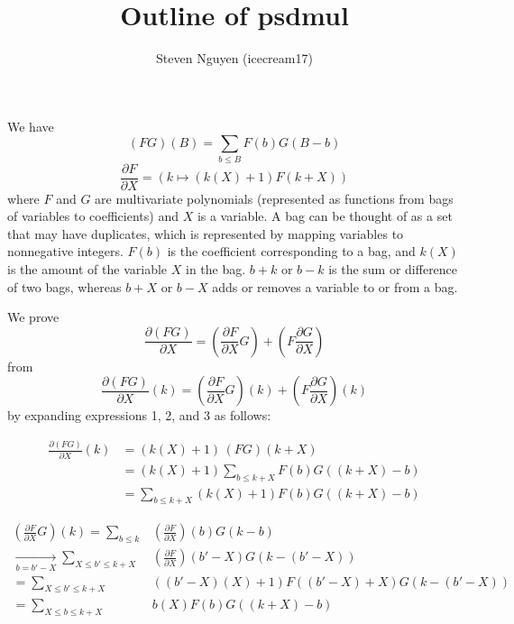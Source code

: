 \documentclass[]{article}
\title{Outline of psdmul}
\author{Steven Nguyen (icecream17)}
\begin{document}
\maketitle

\noindent{}We have
\[
    (FG)(B) = \sum_{b \le B} F(b) G(B-b) \tag{mul}\label{mul}
\]
\[
    \frac{\partial F}{\partial X} = \left( k \mapsto \left(k(X) + 1\right) F(k+X) \right) \tag{psd}\label{psd}
\]
where $F$ and $G$ are multivariate polynomials (represented as functions from bags of variables to coefficients) and $X$ is a variable. A bag can be thought of as a set that may have duplicates, which is represented by mapping variables to nonnegative integers. $F(b)$ is the coefficient corresponding to a bag, and $k(X)$ is the amount of the variable $X$ in the bag. $b + k$ or $b - k$ is the sum or difference of two bags, whereas $b + X$ or $b - X$ adds or removes a variable to or from a bag.

\noindent{}\hrulefill

\noindent{}We prove
\[
    \frac{\partial (FG)}{\partial X} = \left( \frac{\partial F}{\partial X} G \right) + \left( F \frac{\partial G}{\partial X} \right)
\]
from
\[
    \frac{\partial (FG)}{\partial X}(k) = \left( \frac{\partial F}{\partial X} G \right)\!\!(k) + \left( F \frac{\partial G}{\partial X} \right)\!\!(k) \tag{1 = 2 + 3}
\]
by expanding expressions 1, 2, and 3 as follows:

\vspace{-1em}
\begin{align*}
\frac{\partial (FG)}{\partial X}(k)  &= (k(X) + 1) \, (FG)(k+X) \\
&= (k(X) + 1) \sum_{b \le k+X} F(b) G((k+X)-b) \\
&= \sum_{b \le k+X} (k(X) + 1) F(b) G((k+X)-b)  \tag{1}\label{1}
\end{align*}
\hrulefill

\vspace{-1em}
\begin{align*}
\left( \frac{\partial F}{\partial X} G \right)\!\!(k)
= \sum_{b \le k}& \left( \frac{\partial F}{\partial X} \right)\!\!(b) G(k-b) \\
\underset{b = b' - X}{\longrightarrow} \sum_{X \le b' \le k+X}& \left( \frac{\partial F}{\partial X} \right)\!\!(b'-X) G(k-(b'-X)) \\
= \sum_{X \le b' \le k+X}& ((b'-X)(X) + 1) F((b'-X)+X) G(k-(b'-X)) \\
= \sum_{X \le b \le k+X}& b(X) F(b) G((k+X)-b)  \tag{2}\label{2}
\end{align*}
\hrulefill
\end{document}
